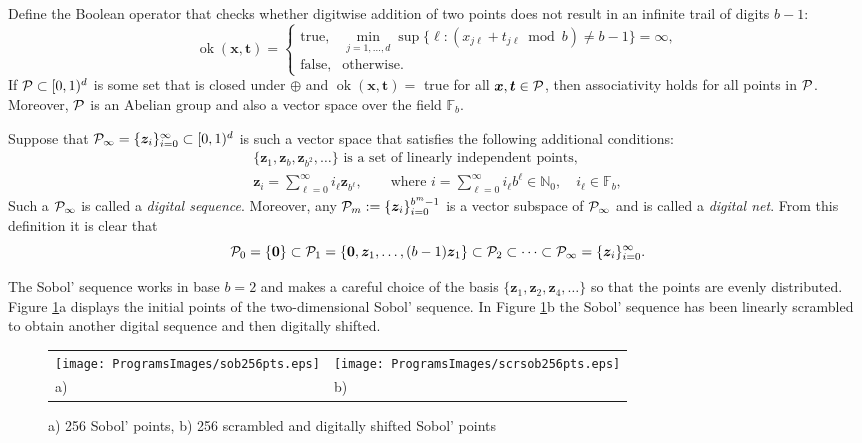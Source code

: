 \documentclass[graybox,footinfo]{svmult}
\newcommand{\N}{\mathbb{N}} %
\newcommand{\F}{\mathbb{F}} %
\newcommand{\bszero}{\boldsymbol{0}} %
\newcommand{\bst}{\boldsymbol{t}}    %
\newcommand{\bsx}{\boldsymbol{x}}    %
\newcommand{\bsz}{\boldsymbol{z}}    %
\DeclareMathOperator{\ok}{ok}
\begin{document}
Define the Boolean operator that checks whether digitwise addition of two points does not result in an infinite trail of digits $b-1$:
\begin{equation*}
\ok(\bsx,\bst)=\begin{cases}
\text{true}, & \min_{j=1,\ldots, d} \sup\{ \ell : (x_{j\ell} + t_{j\ell} \bmod b ) \neq b-1\}=\infty, \\
\text{false}, & \text{otherwise}.
\end{cases}
\end{equation*}
If $\mathcal{P} \subset [0,1)^d$ is some set that is closed under $\oplus$ and $\ok(\bsx,\bst) = $ true for all $\bsx,\bst \in \cp$, then associativity holds for all points in $\mathcal{P}$.  Moreover, $\mathcal{P}$ is an Abelian group and also a vector space over the field $\F_b$.

Suppose that $\cp_\infty =\{\bsz_i\}_{i=0}^{\infty} \subset \cube$ is such a vector space that satisfies the following additional conditions:
\begin{subequations} \label{cpinfvector}
\begin{gather}
\{\bsz_1, \bsz_b, \bsz_{b^2}, \ldots\} \text{ is a set of linearly independent points}, \\
\bsz_i = \sum_{\ell=0}^{\infty} i_\ell \bsz_{b^\ell}, \qquad \text{where }i = \sum_{\ell=0}^{\infty} i_{\ell} b^{\ell} \in \N_0, \quad i_\ell \in \F_b,
\end{gather}
\end{subequations}
Such a $\mathcal{P}_\infty$ is called a \emph{digital sequence}.  Moreover, any $\cp_m := \{\bsz_i\}_{i=0}^{b^m-1}$ is a vector subspace of $\mathcal{P}_\infty$ and is called a \emph{digital net}.  From this definition it is clear that
\[
\cp_0=\{\bszero\}\subset \cp_1=\{\bszero,\bsz_1, \ldots, (b-1) \bsz_1\}  \subset \cp_2 \subset \cdots \subset \cp_{\infty} =\{\bsz_i\}_{i=0}^{\infty}.
\]

The Sobol' sequence works in base $b=2$ and makes a careful choice of the basis $\{\bsz_1, \bsz_2, \bsz_{4}, \ldots\}$ so that the points are evenly distributed. Figure \ref{Sobolfig}a displays the initial points of the two-dimensional Sobol' sequence.  In Figure \ref{Sobolfig}b the Sobol' sequence has been linearly scrambled to obtain another digital sequence and then digitally shifted.

\begin{figure}
\centering
\begin{tabular}{>{\centering}p{5cm}>{\centering}p{5cm}}
\texttt{[image: ProgramsImages/sob256pts.eps]} &
\texttt{[image: ProgramsImages/scrsob256pts.eps]}\tabularnewline
a) & b)
\end{tabular}
\caption{a) 256 Sobol' points, b) 256 scrambled and digitally shifted Sobol' points \label{Sobolfig}}
\end{figure}
\end{document}
